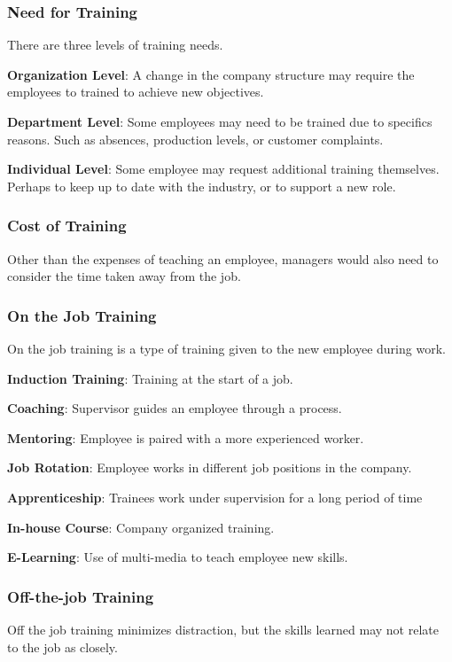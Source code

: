 \documentclass{standalone}
\begin{document}
\subsubsection{Need for Training}
There are three levels of training needs.

\textbf{Organization Level}: A change in the company structure may require the employees to trained to achieve new objectives.

\textbf{Department Level}: Some employees may need to be trained due to specifics reasons. 
Such as absences, production levels, or customer complaints.

\textbf{Individual Level}: Some employee may request additional training themselves.
Perhaps to keep up to date with the industry, or to support a new role.

\subsubsection{Cost of Training}
Other than the expenses of teaching an employee, managers would also need to consider the time taken away from the job.

\subsubsection{On the Job Training}
On the job training is a type of training given to the new employee during work.

\textbf{Induction Training}: Training at the start of a job.

\textbf{Coaching}: Supervisor guides an employee through a process.

\textbf{Mentoring}: Employee is paired with a more experienced worker.

\textbf{Job Rotation}: Employee works in different job positions in the company.

\textbf{Apprenticeship}: Trainees work under supervision for a long period of time

\textbf{In-house Course}: Company organized training.

\textbf{E-Learning}: Use of multi-media to teach employee new skills.

\subsubsection{Off-the-job Training}
Off the job training minimizes distraction, but the skills learned may not relate to the job as closely.
\end{document}
